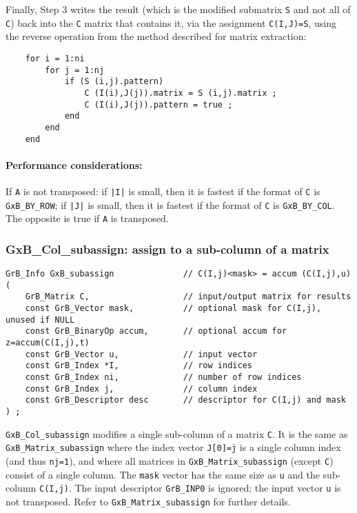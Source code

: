 \documentclass[12pt]{article}
\begin{document}
Finally, Step 3 writes the result (which is the modified submatrix \verb'S' and
not all of \verb'C') back into the \verb'C' matrix that contains it, via the
assignment \verb'C(I,J)=S', using the reverse operation from the method
described for matrix extraction:

    {\footnotesize
    \begin{verbatim}
    for i = 1:ni
        for j = 1:nj
            if (S (i,j).pattern)
                C (I(i),J(j)).matrix = S (i,j).matrix ;
                C (I(i),J(j)).pattern = true ;
            end
        end
    end \end{verbatim}}

\paragraph{\bf Performance considerations:} %
If \verb'A' is not transposed: if \verb'|I|' is small, then it is fastest if
the format of \verb'C' is \verb'GxB_BY_ROW'; if \verb'|J|' is small, then it is
fastest if the format of \verb'C' is \verb'GxB_BY_COL'.  The opposite is true
if \verb'A' is transposed.

\newpage
\subsubsection{{\sf GxB\_Col\_subassign:} assign to a sub-column of a matrix}
\label{subassign_column}

\begin{mdframed}[userdefinedwidth=6in]
{\footnotesize
\begin{verbatim}
GrB_Info GxB_subassign              // C(I,j)<mask> = accum (C(I,j),u)
(
    GrB_Matrix C,                   // input/output matrix for results
    const GrB_Vector mask,          // optional mask for C(I,j), unused if NULL
    const GrB_BinaryOp accum,       // optional accum for z=accum(C(I,j),t)
    const GrB_Vector u,             // input vector
    const GrB_Index *I,             // row indices
    const GrB_Index ni,             // number of row indices
    const GrB_Index j,              // column index
    const GrB_Descriptor desc       // descriptor for C(I,j) and mask
) ;
\end{verbatim} } \end{mdframed}

\verb'GxB_Col_subassign' modifies a single sub-column of a matrix \verb'C'.  It
is the same as \verb'GxB_Matrix_subassign' where the index vector \verb'J[0]=j'
is a single column index (and thus \verb'nj=1'), and where all matrices in
\verb'GxB_Matrix_subassign' (except \verb'C') consist of a single column.  The
\verb'mask' vector has the same size as \verb'u' and the sub-column
\verb'C(I,j)'.  The input descriptor \verb'GrB_INP0' is ignored; the input
vector \verb'u' is not transposed.  Refer to \verb'GxB_Matrix_subassign' for
further details.
\end{document}
